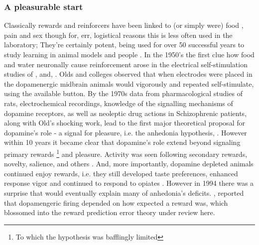\documentclass[doc,12pt]{apa}        %
\begin{document}
\subsubsection{A pleasurable start} %
Classically rewards and reinforcers have been linked to (or simply were) food \cite{ODoherty:2006p2875}, pain \cite{Becerra:2011p7581,schultz:2007aa} and sex though for, err, logistical reasons this is less often used in the laboratory; They're certainly potent, being used for over 50 successful years to study learning in animal models \cite{iversen:2007aa} and people \cite{Kim:2010p7248,Montague:2006mz}.  In the 1950's the first clue how food and water neuronally cause reinforcement arose in the electrical self-stimulation studies of , and, .  Olds and colleges observed that when electrodes were placed in the dopamenergic midbrain animals would vigorously and repeated self-stimulate, using the available button.  By the 1970s data from pharmacological studies of rats, electrochemical recordings, knowledge of the signalling mechanisms of dopamine receptors, as well as neoleptic drug actions in Schizophrenic patients, along with Old's shocking work, lead to the first major theoretical proposal for dopamine's role - a signal for pleasure, i.e. the anhedonia hypothesis, \cite{Wise:1978p8771}.  However within 10 years it became clear that dopamine's role extend beyond signaling primary rewards
\footnote{
    To which the hypothesis was bafflingly limited
} and pleasure. Activity was seen following secondary rewards, novelty, salience, and others \cite{Spanagel:1999p8515, Salamone:2005p8774, BrombergMartin:2010p8834}.  And, more importantly, dopamine depleted animals continued enjoy rewards, i.e. they still developed taste preferences, enhanced response vigor \cite{Cannon:2003p8513} and continued to respond to opiates \cite{Hnasko:2005p8832}.  However in 1994 there was a surprise that would eventually explain many of anhedonia's deficits.  , reported that dopamengeric firing depended on how expected a reward was, which blossomed into the reward prediction error theory under review here.
\end{document}
